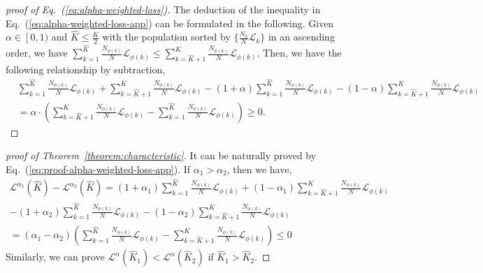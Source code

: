 \documentclass{article} %
\theoremstyle{plain}
\theoremstyle{definition}
\theoremstyle{remark}
\begin{document}
\begin{proof}[proof of Eq.~(\ref{eq:alpha-weighted-loss})]
The deduction of the inequality in Eq.~(\ref{eq:alpha-weighted-loss-app}) can be formulated in the following. Given $\alpha\in\left[0,1)\right.$ and $\widehat{K}\leq \frac{K}{2}$ with the population sorted by $\{\frac{N_k}{N}\mathcal{L}_k\}$ in an ascending order, we have $\sum_{k=1}^{\widehat{K}} \frac{N_{\phi(k)}}{N}\mathcal{L}_{\phi(k)} \leq \sum_{k=\widehat{K}+1}^{K} \frac{N_{\phi(k)}}{N}\mathcal{L}_{\phi(k)}$. Then, we have the following relationship by subtraction,
\begin{align}
\label{eq:proof-alpha-weighted-loss-app}
        & \sum_{k=1}^{\widehat{K}} \frac{N_{\phi(k)}}{N}\mathcal{L}_{\phi(k)} +\sum_{k=\widehat{K}+1}^{K} \frac{N_{\phi(k)}}{N}\mathcal{L}_{\phi(k)} - (1+\alpha)  \sum_{k=1}^{\widehat{K}} \frac{N_{\phi(k)}}{N}\mathcal{L}_{\phi(k)} - (1-\alpha) \sum_{k=\widehat{K}+1}^{K} \frac{N_{\phi(k)}}{N}\mathcal{L}_{\phi(k)} \nonumber \\ 
        & = \alpha \cdot \left( \sum_{k=\widehat{K}+1}^{K} \frac{N_{\phi(k)}}{N}\mathcal{L}_{\phi(k)}-\sum_{k=1}^{\widehat{K}} \frac{N_{\phi(k)}}{N}\mathcal{L}_{\phi(k)}\right) \geq 0 .
\end{align}
\end{proof}


\begin{proof}[proof of Theorem~\ref{theorem:characteristic}]
It can be naturally proved by Eq.~(\ref{eq:proof-alpha-weighted-loss-app}). If $\alpha_1>\alpha_2$, then we have,
\begin{align}
    \mathcal{L}^{\alpha_1}(\widehat{K}) - \mathcal{L}^{\alpha_2}(\widehat{K}) = (1+\alpha_1)  \sum_{k=1}^{\widehat{K}} \frac{N_{\phi(k)}}{N}\mathcal{L}_{\phi(k)} + (1-\alpha_1) \sum_{k=\widehat{K}+1}^{K} \frac{N_{\phi(k)}}{N}\mathcal{L}_{\phi(k)}\nonumber\\
    -(1+\alpha_2)  \sum_{k=1}^{\widehat{K}} \frac{N_{\phi(k)}}{N}\mathcal{L}_{\phi(k)} - (1-\alpha_2) \sum_{k=\widehat{K}+1}^{K} \frac{N_{\phi(k)}}{N}\mathcal{L}_{\phi(k)}\\
    = (\alpha_1-\alpha_2) \left (\sum_{k=1}^{\widehat{K}} \frac{N_{\phi(k)}}{N}\mathcal{L}_{\phi(k)} - \sum_{k=\widehat{K}+1}^{K} \frac{N_{\phi(k)}}{N}\mathcal{L}_{\phi(k)}\right ) \leq 0 \nonumber 
\end{align}
Similarly, we can prove $\mathcal{L}^{\alpha}(\widehat{K}_1)<\mathcal{L}^{\alpha}(\widehat{K}_2)$ if $\widehat{K}_1>\widehat{K}_2$.
\end{proof}
\end{document}
